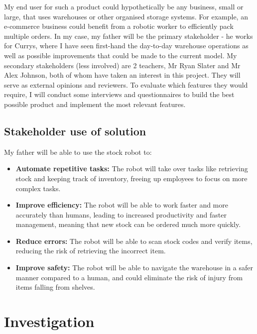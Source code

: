 My end user for such a product could hypothetically be any business, small or large, that uses warehouses or other organised storage systems. For example, an e-commerce business could benefit from a robotic worker to efficiently pack multiple orders.
\textbf{\newline}
\newline
In my case, my father will be the primary stakeholder - he works for Currys, where I have seen first-hand the day-to-day warehouse operations as well as possible improvements that could be made to the current model. My secondary stakeholders (less involved) are 2 teachers, Mr Ryan Slater and Mr Alex Johnson, both of whom have taken an interest in this project. They will serve as external opinions and reviewers.
\newline
To evaluate which features they would require, I will conduct some interviews and questionnaires to build the best possible product and implement the most relevant features.


\subsection{Stakeholder use of solution}

My father will be able to use the stock robot to:

\begin{itemize}
    \item \textbf{Automate repetitive tasks:} The robot will take over tasks like retrieving stock and keeping track of inventory, freeing up employees to focus on more complex tasks.
    \item \textbf{Improve efficiency:} The robot will be able to work faster and more accurately than humans, leading to increased productivity and faster management, meaning that new stock can be ordered much more quickly.
    \item \textbf{Reduce errors:} The robot will be able to scan stock codes and verify items, reducing the risk of retrieving the incorrect item.
    \item \textbf{Improve safety:} The robot will be able to navigate the warehouse in a safer manner compared to a human, and could eliminate the risk of injury from items falling from shelves.
\end{itemize}


\newpage

\section{Investigation}

